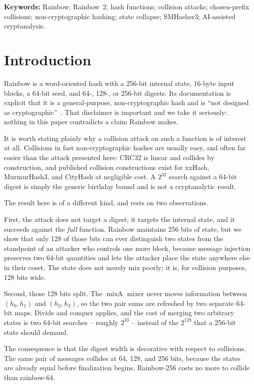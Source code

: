 \documentclass[10pt]{article}
\theoremstyle{definition}
\newcommand{\mixA}{\operatorname{mixA}}
\begin{document}
\noindent\textbf{Keywords:} Rainbow; Rainbow~2; hash functions; collision attacks; chosen-prefix collisions; non-cryptographic hashing; state collapse; SMHasher3; AI-assisted cryptanalysis.

\section{Introduction}
\label{sec:introduction}

Rainbow is a word-oriented hash with a 256-bit internal state, 16-byte input blocks, a 64-bit seed, and 64-, 128-, or 256-bit digests. Its documentation is explicit that it is a general-purpose, non-cryptographic hash and is ``not designed as cryptographic''~\cite{rain-readme}. That disclaimer is important and we take it seriously: nothing in this paper contradicts a claim Rainbow makes.

It is worth stating plainly why a collision attack on such a function is of interest at all. Collisions in fast non-cryptographic hashes are usually easy, and often far easier than the attack presented here: CRC32 is linear and collides by construction, and published collision constructions exist for xxHash, MurmurHash3, and CityHash at negligible cost. A $2^{32}$ search against a 64-bit digest is simply the generic birthday bound and is not a cryptanalytic result.

The result here is of a different kind, and rests on two observations.

First, the attack does not target a digest; it targets the internal state, and it succeeds against the \emph{full} function. Rainbow maintains 256 bits of state, but we show that only 128 of those bits can ever distinguish two states from the standpoint of an attacker who controls one more block, because message injection preserves two 64-bit quantities and lets the attacker place the state anywhere else in their coset. The state does not merely mix poorly; it is, for collision purposes, 128 bits wide.

Second, those 128 bits split. The $\mixA$ mixer never moves information between $(h_0,h_1)$ and $(h_2,h_3)$, so the two pair sums are refreshed by two separate 64-bit maps. Divide and conquer applies, and the cost of merging two arbitrary states is two 64-bit searches -- roughly $2^{33}$ -- instead of the $2^{128}$ that a 256-bit state should demand.

The consequence is that the digest width is decorative with respect to collisions. The same pair of messages collides at 64, 128, and 256 bits, because the states are already equal before finalization begins. Rainbow-256 costs no more to collide than rainbow-64.
\end{document}
